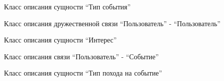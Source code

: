 \documentclass[letterpaper,10pt,english]{sphinxmanual}
\begin{document}

\begin{fulllineitems}
\label{models:mainServer.models.EventType}
Класс описания сущности ``Тип события''

\end{fulllineitems}


\begin{fulllineitems}
\label{models:mainServer.models.Friend}
Класс описания дружественной связи ``Пользователь'' - ``Пользователь''

\end{fulllineitems}


\begin{fulllineitems}
\label{models:mainServer.models.Interest}
Класс описания сущности ``Интерес''

\end{fulllineitems}


\begin{fulllineitems}
\label{models:mainServer.models.Metoo}
Класс описания связи ``Пользователь'' - ``Событие''

\end{fulllineitems}


\begin{fulllineitems}
\label{models:mainServer.models.MetooType}
Класс описания сущности ``Тип похода на событие''

\end{fulllineitems}

\end{document}
